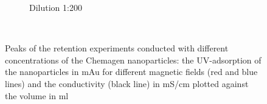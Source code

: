 \begin{figure}
\begin{subfigure}{0.49\textwidth}
          \end{subfigure}\hfill
        \begin{subfigure}{0.49\textwidth}
                \flushright
                \caption{Dilution 1:200}%
        \end{subfigure}
        \\
        
        \caption[Peaks of the retention experiments conducted with different concentrations of the Chemagen nanoparticles]{Peaks of the retention experiments conducted with different concentrations of the Chemagen nanoparticles: the UV-adsorption of the nanoparticles in mAu for different magnetic fields (red and blue lines) and the conductivity (black line) in mS/cm plotted against the volume in ml }
        \label{fig:diff_conc_chemagen_peaks}
  \end{figure}        
		
\setcounter{figure}{0}
		
